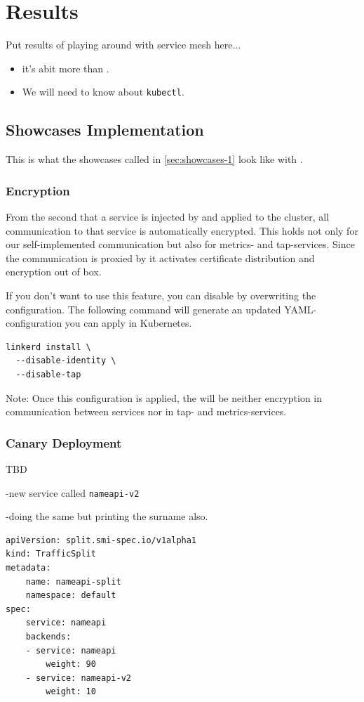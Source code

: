\section{Results}

Put results of playing around with service mesh here...

\begin{itemize}
	\item it's abit more than \linkerd{}.
	\item We will need to know about \lstinline|kubectl|.
\end{itemize}

\subsection{Showcases Implementation}
This is what the showcases called in \autoref{sec:showcases-1} look like with \linkerd{}.

\subsubsection{Encryption}
From the second that a service is injected by \linkerd{} and applied to the cluster, all communication to that service is automatically encrypted.
This holds not only for our self-implemented communication but also for metrics- and tap-services.
Since the communication is proxied by \linkerd{} it activates certificate distribution and encryption out of box.

If you don't want to use this feature, you can disable by overwriting the \linkerd{} configuration.
The following command will generate an updated YAML-configuration you can apply in Kubernetes.
\begin{lstlisting}
linkerd install \
  --disable-identity \
  --disable-tap
\end{lstlisting}
Note: Once this configuration is applied, the will be neither encryption in communication between services nor in tap- and metrics-services.

\subsubsection{Canary Deployment}
\label{sec:canary-result}
TBD

-new service called \lstinline|nameapi-v2|

-doing the same but printing the surname also.

\begin{lstlisting}
apiVersion: split.smi-spec.io/v1alpha1
kind: TrafficSplit
metadata:
	name: nameapi-split
	namespace: default
spec:
	service: nameapi
	backends:
	- service: nameapi
		weight: 90
	- service: nameapi-v2
		weight: 10
\end{lstlisting}


